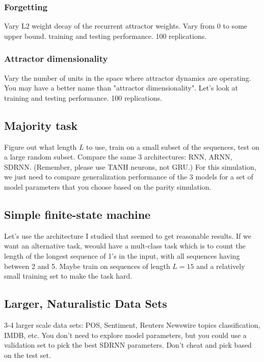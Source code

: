 \documentclass{article}
\begin{document}
\subsubsection{Forgetting}  
Vary L2 weight decay of the recurrent attractor weights.
Vary from 0 to some upper bound. training and testing performance. 100 
replications.

\subsubsection{Attractor dimensionality}
Vary the number of units in the space where attractor dynamics are operating.
You may have a better name than "attractor dimensionality". Let's look
at training and testing performance. 100 replications.

\subsection{Majority task}

Figure out what length $L$ to use, train on a small subset of the sequences,
test on a large random subset. Compare the same 3 architectures: RNN,
ARNN, SDRNN. (Remember, please use TANH neurons, not GRU.) For this
simulation, we just need to compare generalization performance of the 3
models for a set of model parameters that you choose based on the parity
simulation.

\subsection{Simple finite-state machine}

Let's use the architecture I studied that seemed to get reasonable results.
If we want an alternative task, weould have a mult-class task which is
to count the length of the longest sequence of 1's in the input, with
all sequences having between 2 and 5. Maybe train on sequences of length
$L=15$ and a relatively small training set to make the task hard.

\subsection{Larger, Naturalistic Data Sets}

3-4 larger scale data sets: POS, Sentiment, Reuters Newswire topics classification, IMDB, etc.  You don't need to explore model parameters, but you could
use a validation set to pick the best SDRNN parameters. Don't cheat and pick
based on the test set.
\end{document}
